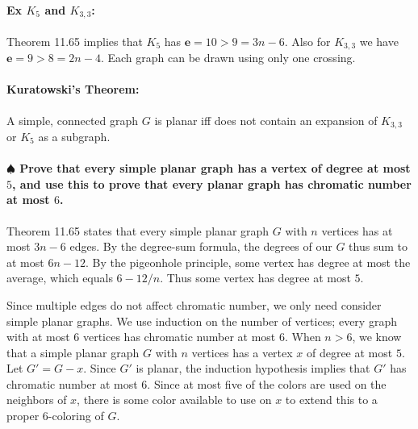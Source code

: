 \documentclass[a4paper, 11pt, twoside]{article}
\begin{document}
\paragraph{Ex $K_5$ and $K_{3,3}$:} Theorem 11.65 implies that $K_5$ has $\textbf{e}=10>9=3n-6$. Also for $K_{3,3}$ we have $\textbf{e}=9>8=2n-4$. Each graph can be drawn using only one crossing.

\paragraph{Kuratowski's Theorem:} A simple, connected graph $G$ is planar iff does not contain an expansion of $K_{3,3}$ or $K_5$ as a subgraph.

\paragraph{$\spadesuit$ Prove that every simple planar graph has a vertex of degree at most $5$, and use this to prove that every planar graph has chromatic number at most $6$.} Theorem 11.65 states that every simple planar graph $G$ with $n$ vertices has at most $3n-6$ edges. By the degree-sum formula, the degrees of our $G$ thus sum to at most $6n-12$. By the pigeonhole principle, some vertex has degree at most the average, which equals $6-12/n$. Thus some vertex has degree at most $5$.

Since multiple edges do not affect chromatic number, we only need consider simple planar graphs. We use induction on the number of vertices; every graph with at most $6$ vertices has chromatic number at most $6$. When $n>6$, we know that a simple planar graph $G$ with $n$ vertices has a vertex $x$ of degree at most $5$. Let $G'=G-x$. Since $G'$ is planar, the induction hypothesis implies that $G'$ has chromatic number at most $6$. Since at most five of the colors are used on the neighbors of $x$, there is some color available to use on $x$ to extend this to a proper $6$-coloring of $G$.
\end{document}
